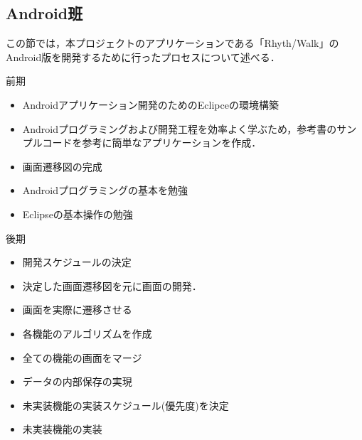 \subsection{Android班}

\par この節では，本プロジェクトのアプリケーションである「Rhyth/Walk」のAndroid版を開発するために行ったプロセスについて述べる．
\par 前期
\begin{itemize}

\item Androidアプリケーション開発のためのEclipceの環境構築
\item Androidプログラミングおよび開発工程を効率よく学ぶため，参考書のサンプルコードを参考に簡単なアプリケーションを作成．
\item 画面遷移図の完成
\item Androidプログラミングの基本を勉強
\item Eclipseの基本操作の勉強
\end{itemize}

\par 後期
\begin{itemize}
\item 開発スケジュールの決定
\item 決定した画面遷移図を元に画面の開発．
\item 画面を実際に遷移させる
\item 各機能のアルゴリズムを作成
\item 全ての機能の画面をマージ
\item データの内部保存の実現
\item 未実装機能の実装スケジュール(優先度)を決定
\item 未実装機能の実装
\end{itemize}

 
